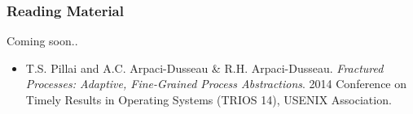 \begin{frame}

\frametitle{Reading Material}

\begin{center}

Coming soon..

\end{center}

\footnotesize

\begin{itemize}

\item T.S. Pillai and A.C. Arpaci-Dusseau \& R.H. Arpaci-Dusseau.
\emph{Fractured Processes: Adaptive, Fine-Grained Process Abstractions}. 2014
Conference on Timely Results in Operating Systems (TRIOS 14), USENIX
Association.

\end{itemize}

\end{frame}
